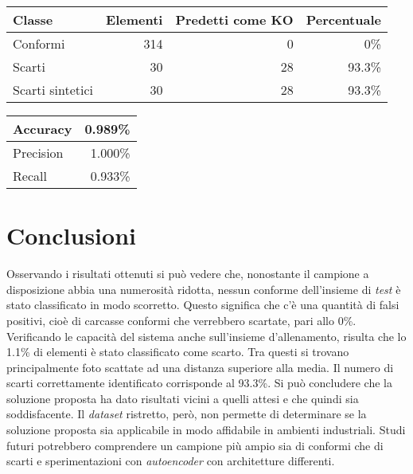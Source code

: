 \documentclass[a0,portrait]{a0poster}
\begin{document}
\begin{multicols}{2}
\begin{minipage}[c]{0.37\textwidth}
  \begin{tabular}{||l r r r||}
    \hline
    Classe           & Elementi & Predetti come KO & Percentuale \\ \hline \hline
    Conformi         & 314      & 0                & 0\%         \\ \hline
    Scarti           & 30       & 28               & 93.3\%      \\ \hline
    Scarti sintetici & 30       & 28               & 93.3\%      \\ \hline
  \end{tabular}
\end{minipage}
\begin{minipage}[c]{0.20\textwidth}
  \begin{tabular}{||l r||}
    \hline
    Accuracy  & 0.989\% \\ \hline
    Precision & 1.000\% \\ \hline
    Recall    & 0.933\% \\ \hline
  \end{tabular}
\end{minipage}

\color{SaddleBrown} %
\section*{Conclusioni}
Osservando i risultati ottenuti si può vedere che, nonostante il campione a disposizione abbia una numerosità ridotta, nessun conforme dell'insieme di \textit{test} è stato classificato in modo scorretto.
Questo significa che c'è una quantità di falsi positivi, cioè di carcasse conformi che verrebbero scartate, pari allo 0\%.
Verificando le capacità del sistema anche sull'insieme d'allenamento, risulta che lo 1.1\% di elementi è stato classificato come scarto.
Tra questi si trovano principalmente foto scattate ad una distanza superiore alla media.
Il numero di scarti correttamente identificato corrisponde al 93.3\%.
Si può concludere che la soluzione proposta ha dato risultati vicini a quelli attesi e che quindi sia soddisfacente.
Il \textit{dataset} ristretto, però, non permette di determinare se la soluzione proposta sia applicabile in modo affidabile in ambienti industriali.
Studi futuri potrebbero comprendere un campione più ampio sia di conformi che di scarti e sperimentazioni con \textit{autoencoder} con architetture differenti.

\end{multicols}
\end{document}
